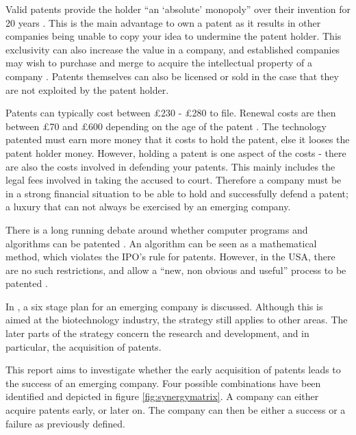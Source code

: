 
Valid patents provide the holder ``an `absolute' monopoly'' over their invention for 20 years \cite{waelde2013contemporary}.
This is the main advantage to own a patent as it results in other companies being unable to copy your idea to undermine the patent holder.
This exclusivity can also increase the value in a company, and established companies may wish to purchase and merge to acquire the intellectual property of a company \cite{NEEDED}. 
Patents themselves can also be licensed or sold in the case that they are not exploited by the patent holder. 

Patents can typically cost between \pounds 230 - \pounds 280 to file. 
Renewal costs are then between \pounds 70 and \pounds 600 depending on the age of the patent \cite{ipocosts}.
The technology patented must earn more money that it costs to hold the patent, else it looses the patent holder money.
However, holding a patent is one aspect of the costs - there are also the costs involved in defending your patents.
This mainly includes the legal fees involved in taking the accused to court. 
Therefore a company must be in a strong financial situation to be able to hold and successfully defend a patent; a luxury that can not always be exercised by an emerging company.


There is a long running debate around whether computer programs and algorithms can be patented \cite{juden2005can, klemens2005math}.
An algorithm can be seen as a mathematical method, which violates the IPO's rule for patents.
However, in the USA, there are no such restrictions, and allow a ``new, non obvious and useful'' process to be patented \cite{usapatent}.

In \cite{zahra1996technology}, a six stage plan for an emerging company is discussed. 
Although this is aimed at the biotechnology industry, the strategy still applies to other areas. 
The later parts of the strategy concern the research and development, and in particular, the acquisition of patents. 


This report aims to investigate whether the early acquisition of patents leads to the success of an emerging company.
Four possible combinations have been identified and depicted in figure \ref{fig:synergymatrix}. 
A company can either acquire patents early, or later on. 
The company can then be either a success or a failure as previously defined.

